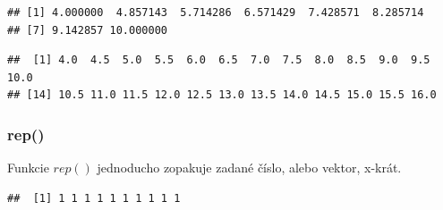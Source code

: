 \begin{Shaded}
\begin{Highlighting}[]
\NormalTok{(} \NormalTok{, } \NormalTok{, } \NormalTok{)}
\end{Highlighting}
\end{Shaded}

\begin{verbatim}
## [1] 4.000000  4.857143  5.714286  6.571429  7.428571  8.285714
## [7] 9.142857 10.000000
\end{verbatim}

\newline

\begin{Shaded}
\begin{Highlighting}[]
\NormalTok{(} \NormalTok{, } \NormalTok{, } \NormalTok{)}
\end{Highlighting}
\end{Shaded}

\begin{verbatim}
##  [1] 4.0  4.5  5.0  5.5  6.0  6.5  7.0  7.5  8.0  8.5  9.0  9.5 10.0 
## [14] 10.5 11.0 11.5 12.0 12.5 13.0 13.5 14.0 14.5 15.0 15.5 16.0
\end{verbatim}

\hypertarget{rep}{%
\subsubsection{rep()}\label{rep}}

Funkcie \(rep()\) jednoducho zopakuje zadané číslo, alebo vektor,
x-krát.

\begin{Shaded}
\begin{Highlighting}[]
\NormalTok{(} \NormalTok{, } \NormalTok{)}
\end{Highlighting}
\end{Shaded}

\begin{verbatim}
##  [1] 1 1 1 1 1 1 1 1 1 1
\end{verbatim}

\begin{Shaded}
\begin{Highlighting}[]
\NormalTok{(} \NormalTok{(}\NormalTok{, }\NormalTok{, }\NormalTok{), } \NormalTok{)}
\end{Highlighting}
\end{Shaded}

